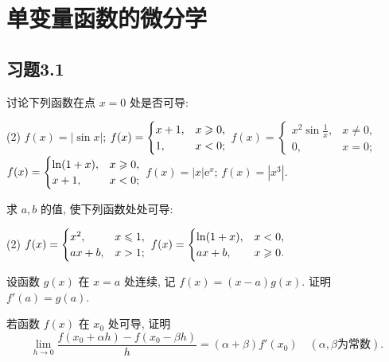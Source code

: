 \chapter{单变量函数的微分学}

\section{习题3.1}

\begin{exercise}[3.1.1]
    讨论下列函数在点 $x=0$ 处是否可导:
    \begin{tasks}[label=(\arabic*)](2)
        \task $f(x) = |\sin x|$;
        \task $f(x) = \begin{cases} x+1, & x \geqslant 0, \\ 1, & x < 0; \end{cases}$
        \task $f(x) = \begin{cases} x^2\sin\frac{1}{x}, & x \ne 0, \\ 0, & x=0; \end{cases}$
        \task $f(x) = \begin{cases} \ln(1+x), & x \geqslant 0, \\ x+1, & x < 0; \end{cases}$
        \task $f(x) = |x|\mathrm{e}^x$;
        \task $f(x) = |x^3|$.
    \end{tasks}
\end{exercise}

\begin{exercise}[3.1.2]
    求 $a,b$ 的值, 使下列函数处处可导:
    \begin{tasks}[label=(\arabic*)](2)
        \task $f(x) = \begin{cases} x^2, & x \leqslant 1, \\ ax+b, & x > 1; \end{cases}$
        \task $f(x) = \begin{cases} \ln(1+x), & x < 0, \\ ax+b, & x \geqslant 0. \end{cases}$
    \end{tasks}
\end{exercise}

\begin{exercise}[3.1.3]
    设函数 $g(x)$ 在 $x=a$ 处连续, 记 $f(x) = (x-a)g(x)$. 证明 $f'(a)=g(a)$.
\end{exercise}

\begin{exercise}[3.1.4]
    若函数 $f(x)$ 在 $x_0$ 处可导, 证明
    $$ \lim_{h \to 0} \frac{f(x_0+\alpha h) - f(x_0-\beta h)}{h} = (\alpha+\beta)f'(x_0) \quad (\alpha, \beta \text{为常数}). $$
\end{exercise}

